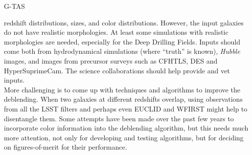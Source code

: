 \begin{tasklist}{G-TAS}
\begin{task}
{redshift distributions, sizes, and color distributions. However, the
input galaxies do not have realistic morphologies. At least some simulations
with realistic morphologies are needed, especially for the Deep Drilling Fields. 
Inputs should come both from hydrodynamical simulations (where ``truth'' is known),
{\it Hubble} images, and images from precursor surveys such as CFHTLS, DES and HyperSuprimeCam.
The science collaborations should help provide and vet inputs. \\
More challenging is to come up with techniques and algorithms to improve the
deblending. When two galaxies at different redshifts overlap, using observations
from all the LSST filters and perhaps even EUCLID and WFIRST might 
help to disentangle them. Some attempts have been made over the past few years
to incorporate color information into the deblending algorithm, but this needs
much more attention, not only for developing and testing algorithms, but for
deciding on figures-of-merit for their performance.
}
\end{task}


\end{tasklist}
